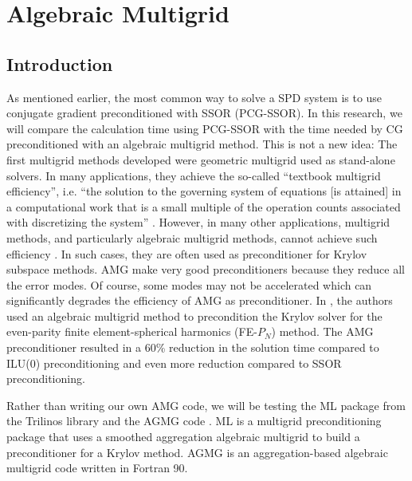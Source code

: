 \section{Algebraic Multigrid} \label{sec_amg}
\subsection{Introduction}
As mentioned earlier, the most common way to solve a SPD system is to use
conjugate gradient preconditioned with SSOR (PCG-SSOR). In this research, we
will compare the calculation time using PCG-SSOR with the time needed by CG 
preconditioned with an algebraic multigrid method. This is not a new idea: The 
first multigrid methods developed were geometric multigrid used as stand-alone 
solvers. In many applications, they achieve the so-called ``textbook multigrid
efficiency'', i.e. ``the solution to the governing system of equations [is
attained] in a computational work that is a small multiple of the operation
counts associated with discretizing the system'' \cite{textbook_eff}. However, 
in many other applications, multigrid methods, and particularly algebraic 
multigrid methods, cannot achieve such efficiency \cite{k_cycle}. In
such cases, they are often used as preconditioner for Krylov subspace methods. 
AMG make  very good preconditioners because they reduce all the error modes. Of
course, some modes may not be accelerated which can significantly degrades the 
efficiency of AMG as preconditioner. In \cite{amg_pn}, the authors used an 
algebraic multigrid method to precondition the Krylov solver for the even-parity 
finite element-spherical harmonics (FE-$P_N$) method. The AMG preconditioner 
resulted in a 60\% reduction in the solution time compared to ILU(0) 
preconditioning and even more reduction compared to SSOR preconditioning. 

Rather than writing our own AMG code, we will be testing the ML package 
\cite{ml_guide} from the Trilinos library and the AGMG code \cite{agmg_guide}. 
ML is a multigrid preconditioning package that uses a smoothed aggregation 
algebraic multigrid to build a preconditioner for a Krylov method. AGMG is an 
aggregation-based algebraic multigrid code written in Fortran 90.


